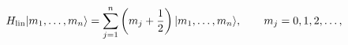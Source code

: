 \begin{equation}
H_{\rm lin}|m_1,\ldots, m_n\rangle = \sum_{j=1}^n 
\left(m_j + {1\over 2}\right)|m_1,\ldots, m_n\rangle,\qquad 
m_j=0,1,2,\ldots,
\label{oegg}
\end{equation}

